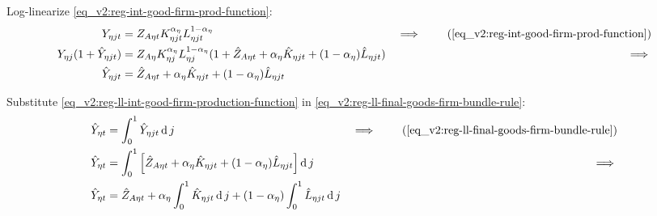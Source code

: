 \documentclass[../thesis.tex]{subfiles}
\begin{document}
Log-linearize \ref{eq_v2:reg-int-good-firm-prod-function}:
\begin{alignat}{2}
	Y_{\eta jt} &= Z_{A\eta t} K_{\eta jt}^{\alpha_{\eta}} L_{\eta jt}^{1-\alpha_{\eta}} &\implies \tag{\ref{eq_v2:reg-int-good-firm-prod-function}} \\
	Y_{\eta j} (1+ \hat{Y}_{\eta jt}) &= Z_{A\eta} K_{\eta j}^{\alpha_{\eta}} L_{\eta j}^{1-\alpha_{\eta}} (1+ \hat{Z}_{A\eta t} + {\alpha_{\eta}} \hat{K}_{\eta jt} + (1-\alpha_{\eta}) \hat{L}_{\eta jt}) &\implies \nonumber \\
	\hat{Y}_{\eta jt} &= \hat{Z}_{A\eta t} + {\alpha_{\eta}} \hat{K}_{\eta jt} + (1-\alpha_{\eta}) \hat{L}_{\eta jt} \label{eq_v2:reg-ll-int-good-firm-production-function}
\end{alignat}

Substitute \ref{eq_v2:reg-ll-int-good-firm-production-function} in \ref{eq_v2:reg-ll-final-goods-firm-bundle-rule}:
\begin{alignat}{2}
	\hat{Y}_{\eta t} &= \int_{0}^{1} \hat{Y}_{\eta jt} \dif j &\implies \tag{\ref{eq_v2:reg-ll-final-goods-firm-bundle-rule}} \\
	\hat{Y}_{\eta t} &= \int_{0}^{1} \left[ \hat{Z}_{A\eta t} + {\alpha_{\eta}} \hat{K}_{\eta jt} + (1-\alpha_{\eta}) \hat{L}_{\eta jt} \right] \dif j &\implies \nonumber \\
	\hat{Y}_{\eta t} &= \hat{Z}_{A\eta t} + {\alpha_{\eta}} \int_{0}^{1} \hat{K}_{\eta jt} \dif j + (1-\alpha_{\eta}) \int_{0}^{1} \hat{L}_{\eta jt} \dif j \label{eq_v2:reg-ll-final-goods-firm-bundle-rule-2}
\end{alignat}

\begin{comment}
	
Log-linearize \ref{eq_v2:reg-int-good-firm-prod-function}:
\begin{alignat}{2}
	Y_{\eta jt} &= Z_{A\eta t} L_{\eta jt} &\implies \tag{\ref{eq_v2:reg-int-good-firm-prod-function}} \\
	\hat{Y}_{\eta jt} &= \hat{Z}_{A\eta t} + \hat{L}_{\eta jt} %
\end{alignat}	

Substitute \ref{eq_v2:reg-ll-int-good-firm-production-function} in \ref{eq_v2:reg-ll-final-goods-firm-bundle-rule}:
\begin{alignat}{2}
	\hat{Y}_{\eta t} &= \int_{0}^{1} \hat{Y}_{\eta jt} \dif j &\implies \tag{\ref{eq_v2:reg-ll-final-goods-firm-bundle-rule}} \\
	\hat{Y}_{\eta t} &= \hat{Z}_{A\eta t} + \int_{0}^{1} \hat{L}_{\eta jt} \dif j \label{eq_v2:reg-ll-final-goods-firm-bundle-rule-2}
\end{alignat}
	
\end{comment}
\end{document}
